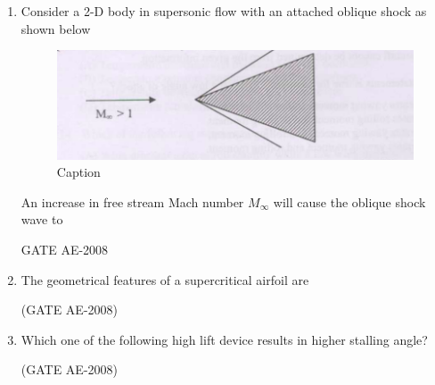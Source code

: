 \documentclass[journal,12pt,onecolumn]{IEEEtran}
\theoremstyle{remark}
\begin{document}
\begin{enumerate}
\item Consider a 2-D body in supersonic flow with an attached oblique shock as shown below  
\begin{figure}[H]
    \centering
    \includegraphics[width=0.5\linewidth]{figs/Screenshot from 2025-08-08 11-48-03.png}
    \caption{Caption}
    \label{fig:placeholder}
\end{figure}
An increase in free stream Mach number $M_\infty$ will cause the oblique shock wave to 
\begin{enumerate}
\end{enumerate}
 \hfill{GATE AE-2008}

    \quad

\item The geometrical features of a supercritical airfoil are  
\begin{enumerate}
\end{enumerate}
 \hfill(GATE AE-2008)

    \quad

\item Which one of the following high lift device results in higher stalling angle? 
\begin{enumerate}
\end{enumerate}
 \hfill(GATE AE-2008)


\end{enumerate}
\end{document}

